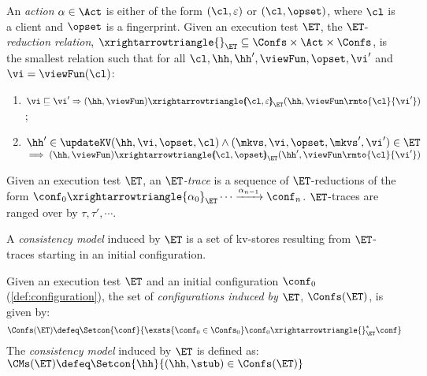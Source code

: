 \begin{definition}[$\ET$-trace]
\label{def:reduction}
An \emph{action} $\alpha \in \Act$ is either of the form $(\cl, \varepsilon)$ or $(\cl, \opset)$, 
where $\cl$ is a client and $\opset$ is a fingerprint. 
Given an execution test $\ET$, the $\ET$-\emph{reduction relation},
$\xrightarrowtriangle{}_{\ET} \subseteq \Confs \times \Act \times \Confs$, 
is the smallest relation such that for all $\cl, \hh, \hh', \viewFun, \opset, \vi'$ and $\vi = \viewFun(\cl)$:
\begin{enumerate}
	\item
    $\vi \sqsubseteq \vi'
    \Rightarrow
    (\hh, \viewFun) \xrightarrowtriangle{\hspace{-5pt}(\cl, \varepsilon)\hspace{-5pt}}_{\ET} 
    (\hh, \viewFun\rmto{\cl}{\vi'})$; 
	\item 
    $\hh' \in \updateKV(\hh, \vi , \opset, \cl)
     \wedge (\mkvs, \vi, \opset, \mkvs', \vi') \in \ET
	$  \\
	\phantom{a} \hfill $\implies (\hh, \viewFun) \xrightarrowtriangle{\hspace{-5pt}(\cl, \opset)\hspace{-5pt}}_{\ET} (\hh', \viewFun\rmto{\cl}{\vi'})$
\end{enumerate}
Given an execution test $\ET$, an \emph{$\ET$-trace} is a sequence of $\ET$-reductions of the form $\conf_{0} \xrightarrowtriangle{\alpha_{0}}_{\ET} \cdots 
\xrightarrow{\alpha_{n-1}} \conf_{n}$. $\ET$-traces are ranged over by $\tau, \tau', \cdots$.
\end{definition}




A \emph{consistency model} induced by $\ET$ is a set of kv-stores
resulting from $\ET$-traces starting in an 
initial configuration. 

\begin{definition}
\label{def:cm}
Given an execution test $\ET$ and an initial configuration $\conf_0$ (\cref{def:configuration}),
the set of \emph{configurations induced by $\ET$},  $\Confs(\ET)$, is   given by: 
\[
\Confs(\ET)\defeq 
\Setcon{ \conf}{ 
	\exsts{\conf_0 \in \Confs_0}
	\conf_0 \xrightarrowtriangle{}_{\ET}^{*} \conf
}
\]
The \emph{consistency model} induced by $\ET$ is defined as:
\( 
\CMs(\ET) \defeq \Setcon{ \hh }{ (\hh, \stub) \in \Confs(\ET) }
\)
\end{definition}


